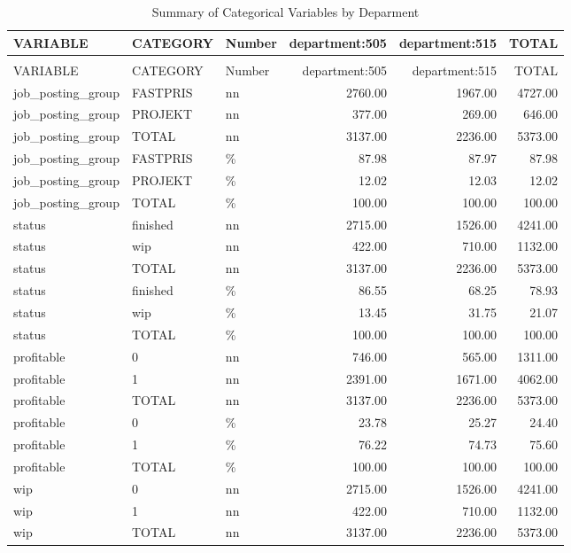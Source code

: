 \begingroup\fontsize{9}{11}\selectfont

\begin{longtable}[t]{lllrrr}
\caption{Summary of Categorical Variables by Deparment}\\
\toprule
VARIABLE & CATEGORY & Number & department:505 & department:515 & TOTAL\\
\midrule
\endfirsthead
\caption[]{Summary of Categorical Variables by Deparment }\\
\toprule
VARIABLE & CATEGORY & Number & department:505 & department:515 & TOTAL\\
\midrule
\endhead

\endfoot
\bottomrule
\endlastfoot
job\_posting\_group & FASTPRIS & nn & 2760.00 & 1967.00 & 4727.00\\
job\_posting\_group & PROJEKT & nn & 377.00 & 269.00 & 646.00\\
job\_posting\_group & TOTAL & nn & 3137.00 & 2236.00 & 5373.00\\
job\_posting\_group & FASTPRIS & \% & 87.98 & 87.97 & 87.98\\
job\_posting\_group & PROJEKT & \% & 12.02 & 12.03 & 12.02\\
job\_posting\_group & TOTAL & \% & 100.00 & 100.00 & 100.00\\
status & finished & nn & 2715.00 & 1526.00 & 4241.00\\
status & wip & nn & 422.00 & 710.00 & 1132.00\\
status & TOTAL & nn & 3137.00 & 2236.00 & 5373.00\\
status & finished & \% & 86.55 & 68.25 & 78.93\\
status & wip & \% & 13.45 & 31.75 & 21.07\\
status & TOTAL & \% & 100.00 & 100.00 & 100.00\\
profitable & 0 & nn & 746.00 & 565.00 & 1311.00\\
profitable & 1 & nn & 2391.00 & 1671.00 & 4062.00\\
profitable & TOTAL & nn & 3137.00 & 2236.00 & 5373.00\\
profitable & 0 & \% & 23.78 & 25.27 & 24.40\\
profitable & 1 & \% & 76.22 & 74.73 & 75.60\\
profitable & TOTAL & \% & 100.00 & 100.00 & 100.00\\
wip & 0 & nn & 2715.00 & 1526.00 & 4241.00\\
wip & 1 & nn & 422.00 & 710.00 & 1132.00\\
wip & TOTAL & nn & 3137.00 & 2236.00 & 5373.00\\

\end{longtable}
